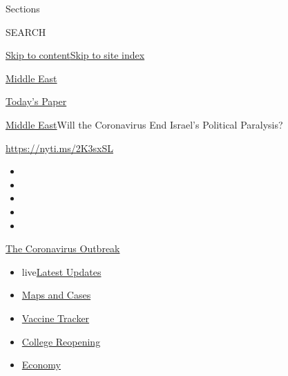 Sections

SEARCH

\protect\hyperlink{site-content}{Skip to
content}\protect\hyperlink{site-index}{Skip to site index}

\href{https://www.nytimes3xbfgragh.onion/section/world/middleeast}{Middle
East}

\href{https://myaccount.nytimes3xbfgragh.onion/auth/login?response_type=cookie\&client_id=vi}{}

\href{https://www.nytimes3xbfgragh.onion/section/todayspaper}{Today's
Paper}

\href{/section/world/middleeast}{Middle East}\textbar{}Will the
Coronavirus End Israel's Political Paralysis?

\url{https://nyti.ms/2K3sxSL}

\begin{itemize}
\item
\item
\item
\item
\item
\end{itemize}

\href{https://www.nytimes3xbfgragh.onion/news-event/coronavirus?action=click\&pgtype=Article\&state=default\&region=TOP_BANNER\&context=storylines_menu}{The
Coronavirus Outbreak}

\begin{itemize}
\tightlist
\item
  live\href{https://www.nytimes3xbfgragh.onion/2020/08/04/world/coronavirus-covid-19.html?action=click\&pgtype=Article\&state=default\&region=TOP_BANNER\&context=storylines_menu}{Latest
  Updates}
\item
  \href{https://www.nytimes3xbfgragh.onion/interactive/2020/us/coronavirus-us-cases.html?action=click\&pgtype=Article\&state=default\&region=TOP_BANNER\&context=storylines_menu}{Maps
  and Cases}
\item
  \href{https://www.nytimes3xbfgragh.onion/interactive/2020/science/coronavirus-vaccine-tracker.html?action=click\&pgtype=Article\&state=default\&region=TOP_BANNER\&context=storylines_menu}{Vaccine
  Tracker}
\item
  \href{https://www.nytimes3xbfgragh.onion/2020/08/02/us/covid-college-reopening.html?action=click\&pgtype=Article\&state=default\&region=TOP_BANNER\&context=storylines_menu}{College
  Reopening}
\item
  \href{https://www.nytimes3xbfgragh.onion/live/2020/08/03/business/stock-market-today-coronavirus?action=click\&pgtype=Article\&state=default\&region=TOP_BANNER\&context=storylines_menu}{Economy}
\end{itemize}

